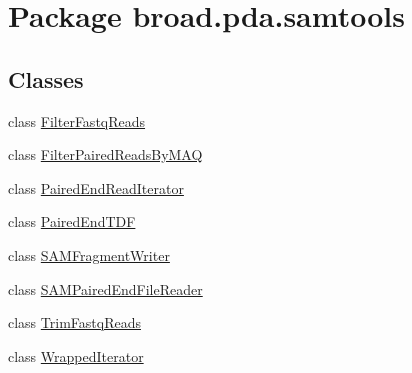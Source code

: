 \hypertarget{namespacebroad_1_1pda_1_1samtools}{\section{Package broad.\+pda.\+samtools}
\label{namespacebroad_1_1pda_1_1samtools}
}
\subsection*{Classes}
\begin{DoxyCompactItemize}
\item 
class \hyperlink{classbroad_1_1pda_1_1samtools_1_1_filter_fastq_reads}{Filter\+Fastq\+Reads}
\item 
class \hyperlink{classbroad_1_1pda_1_1samtools_1_1_filter_paired_reads_by_m_a_q}{Filter\+Paired\+Reads\+By\+M\+A\+Q}
\item 
class \hyperlink{classbroad_1_1pda_1_1samtools_1_1_paired_end_read_iterator}{Paired\+End\+Read\+Iterator}
\item 
class \hyperlink{classbroad_1_1pda_1_1samtools_1_1_paired_end_t_d_f}{Paired\+End\+T\+D\+F}
\item 
class \hyperlink{classbroad_1_1pda_1_1samtools_1_1_s_a_m_fragment_writer}{S\+A\+M\+Fragment\+Writer}
\item 
class \hyperlink{classbroad_1_1pda_1_1samtools_1_1_s_a_m_paired_end_file_reader}{S\+A\+M\+Paired\+End\+File\+Reader}
\item 
class \hyperlink{classbroad_1_1pda_1_1samtools_1_1_trim_fastq_reads}{Trim\+Fastq\+Reads}
\item 
class \hyperlink{classbroad_1_1pda_1_1samtools_1_1_wrapped_iterator}{Wrapped\+Iterator}
\end{DoxyCompactItemize}
